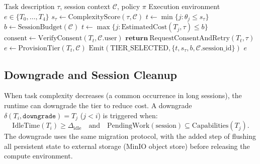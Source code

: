 \begin{algorithm}[H]
\caption{Adaptive Tier Selection}
\label{alg:tier}
\begin{algorithmic}[1]
\Require Task description $\tau$, session context $\mathcal{C}$, policy $\pi$
\Ensure Execution environment $e \in \{T_0, \ldots, T_4\}$
\State $s_\tau \gets \text{ComplexityScore}(\tau, \mathcal{C})$
\State $t \gets \min\{j : \theta_j \leq s_\tau\}$
\State $b \gets \text{SessionBudget}(\mathcal{C})$
    \State $t \gets \max\{j : \text{EstimatedCost}(T_j, \tau) \leq b\}$
\EndIf
\State $\text{consent} \gets \text{VerifyConsent}(T_t, \mathcal{C}.\text{user})$
    \State $\textbf{return}\ \text{RequestConsentAndRetry}(T_t, \tau)$
\EndIf
\State $e \gets \text{ProvisionTier}(T_t, \mathcal{C})$
\State $\text{Emit}(\text{TIER\_SELECTED}, \{t, s_\tau, b, \mathcal{C}.\text{session\_id}\})$
\State \Return $e$
\end{algorithmic}
\end{algorithm}

\subsection{Downgrade and Session Cleanup}

When task complexity decreases (a common occurrence in long sessions), the
runtime can downgrade the tier to reduce cost. A downgrade $\delta(T_i,
\texttt{downgrade}) = T_j$ ($j < i$) is triggered when:
\begin{equation}
    \text{IdleTime}(T_i) \geq \Delta_{\text{idle}} \quad \text{and} \quad
    \text{PendingWork}(\text{session}) \subseteq \text{Capabilities}(T_j).
\end{equation}
The downgrade uses the same migration protocol, with the added step of
flushing all persistent state to external storage (MinIO object store) before
releasing the compute environment.

